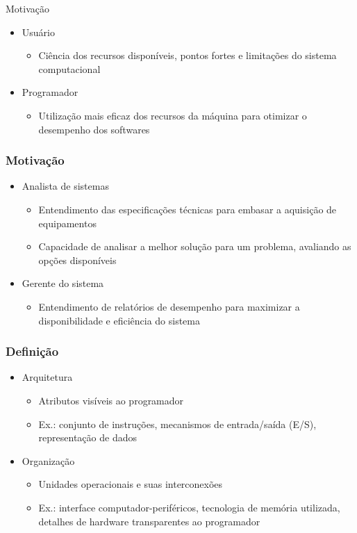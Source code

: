 \documentclass[aspectratio=169,
				xcolor=table]{beamer}
\begin{document}
	\begin{frame}{Motivação}
		\begin{itemize}
			\item Usuário
			\begin{itemize}
				\item Ciência dos recursos disponíveis, pontos fortes e limitações do sistema computacional
			\end{itemize}
			\vspace{1em}
			\item Programador
			\begin{itemize}
				\item Utilização mais eficaz dos recursos da máquina para otimizar o desempenho dos softwares
			\end{itemize}
		\end{itemize}
	\end{frame}
	
	\begin{frame}
		\frametitle{Motivação}
		\begin{itemize}
			\item Analista de sistemas
			\begin{itemize}
				\item Entendimento das especificações técnicas para embasar a aquisição de equipamentos
				\item Capacidade de analisar a melhor solução para um problema, avaliando as opções disponíveis
			\end{itemize}
			\vspace{1em}
			\item Gerente do sistema
			\begin{itemize}
				\item Entendimento de relatórios de desempenho para maximizar a disponibilidade e eficiência do sistema
			\end{itemize}
		\end{itemize}
	\end{frame}

	\begin{frame}
		\frametitle{Definição}
		\begin{itemize}
			\item Arquitetura
			\begin{itemize}
				\item Atributos visíveis ao programador
				\item Ex.: conjunto de instruções, mecanismos de entrada/saída (E/S), representação de dados
			\end{itemize}
			\vspace{1em}
			\item Organização
			\begin{itemize}
				\item Unidades operacionais e suas interconexões
				\item Ex.: interface computador-periféricos, tecnologia de memória utilizada, detalhes de hardware transparentes ao programador
			\end{itemize}
		\end{itemize}
	\end{frame}
	
\end{document}
